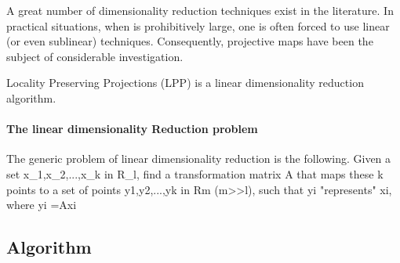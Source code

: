 \documentclass[12pt,a4paper]{book}
\begin{document}
A great number of dimensionality reduction techniques exist in the literature. In practical 	situations, when is prohibitively large, one is often forced to use linear (or even sublinear) 	techniques. Consequently, projective maps have been the subject of considerable 	investigation.
	
Locality Preserving Projections (LPP) is a linear dimensionality reduction algorithm.

	\paragraph{The linear dimensionality Reduction problem}
The generic problem of linear dimensionality reduction is the following. Given a set x_1,x_2,...,x_k in R_l, find a transformation matrix A that maps these k points to a set of points y1,y2,...,yk in Rm (m>>l), such that yi "represents" xi, where yi =Axi

\subsection{Algorithm}
\end{document}
